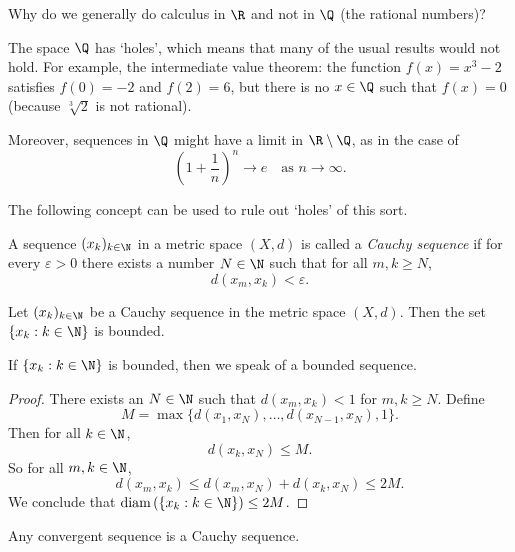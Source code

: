 %
%




Why do we generally do calculus in $\R$ and not in $\Q$ (the rational numbers)?

The space $\Q$ has `holes', which means that many of the usual results would not
hold. For example, the intermediate value theorem: the function $f(x) = x^3 - 2$
satisfies $f(0) = -2$ and $f(2) = 6$, but there is no $x \in \Q$ such
that $f(x) = 0$ (because $\sqrt[3]{2}$ is not rational).

Moreover, sequences in $\Q$ might have a limit in $\R\setminus \Q$, as in the case of 
$$
\left(1+\frac1n\right)^n \to e \quad \textrm{as } n\to \infty.
$$

The following concept can be used to rule out `holes' of this sort.

\begin{definition}
A sequence $(x_k)_{k \in \N}$ in a metric space $(X,d)$ is called a \emph{Cauchy
sequence} if for every $\varepsilon > 0$ there exists a number $N \in \N$ such
that for all $m,k \ge N$,
\[
d(x_m,x_k) < \varepsilon.
\]
\end{definition}

\begin{theorem} \label{thm:bounded}
Let $(x_k)_{k \in \N}$ be a Cauchy sequence in the metric
space $(X,d)$. Then the set $\{x_k: k \in \N\}$ is bounded.
\end{theorem}

\begin{remark}
If $\{x_k: k \in \N\}$ is bounded, then we speak
of a bounded sequence.
\end{remark}

\begin{proof}
There exists an $N \in \N$ such that $d(x_m,x_k) < 1$ for $m,k \ge N$. Define
\[
M = \max\{d(x_1,x_N),\ldots,d(x_{N - 1},x_N),1\}.
\]
Then for all $k \in \N$,
\[
d(x_k,x_N) \le M.
\]
So for all $m,k \in \N$,
\[
d(x_m,x_k) \le d(x_m,x_N) + d(x_k,x_N) \le 2M.
\]
We conclude that $\textrm{diam} \left(\{x_k: k \in \N\}\right) \leq 2M$.
\end{proof}

\begin{theorem} \label{thm:Cauchy}
Any convergent sequence is a Cauchy sequence.
\end{theorem}

